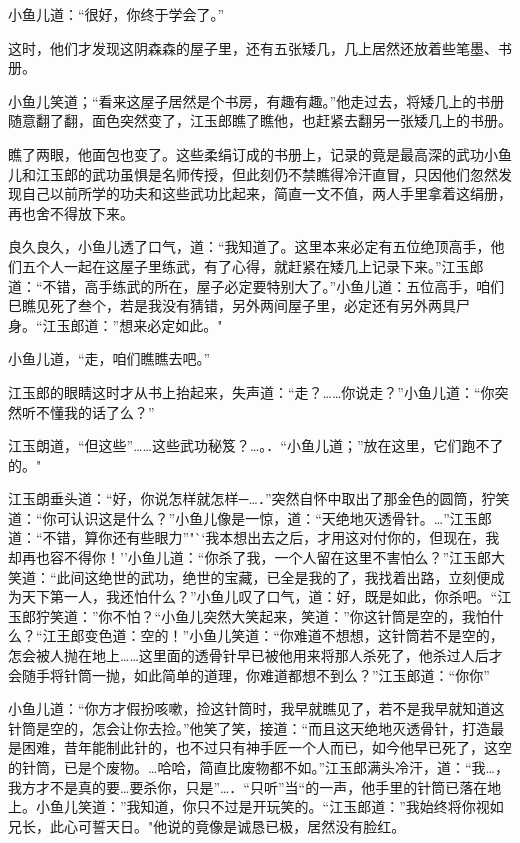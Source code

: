 \documentclass[12pt,oneside]{book}
\begin{document}
小鱼儿道：``很好，你终于学会了。''

这时，他们才发现这阴森森的屋子里，还有五张矮几，几上居然还放着些笔墨、书册。

小鱼儿笑道；``看来这屋子居然是个书房，有趣有趣。''他走过去，将矮几上的书册随意翻了翻，面色突然变了，江玉郎瞧了瞧他，也赶紧去翻另一张矮几上的书册。

瞧了两眼，他面包也变了。这些柔绢订成的书册上，记录的竟是最高深的武功小鱼儿和江玉郎的武功虽惧是名师传授，但此刻仍不禁瞧得冷汗直冒，只因他们忽然发现自己以前所学的功夫和这些武功比起来，简直一文不值，两人手里拿着这绢册，再也舍不得放下来。

良久良久，小鱼儿透了口气，道：``我知道了。这里本来必定有五位绝顶高手，他们五个人一起在这屋子里练武，有了心得，就赶紧在矮几上记录下来。''江玉郎道：``不错，高手练武的所在，屋子必定要特别大了。''小鱼儿道：五位高手，咱们巳瞧见死了叁个，若是我没有猜错，另外两间屋子里，必定还有另外两具尸身。``江玉郎道：''想来必定如此。"

小鱼儿道，``走，咱们瞧瞧去吧。''

江玉郎的眼睛这时才从书上抬起来，失声道：``走？\ldots\ldots 你说走？''小鱼儿道：``你突然听不懂我的话了么？''

江玉朗道，``但这些''\ldots\ldots 这些武功秘笈？\ldots。．``小鱼儿道；''放在这里，它们跑不了的。"

江玉朗垂头道：``好，你说怎样就怎样─\ldots．''突然自怀中取出了那金色的圆筒，狞笑道：``你可认识这是什么？''小鱼儿像是一惊，道：``天绝地灭透骨针。\ldots{}''江玉郎道：``不错，算你还有些眼力''"``我本想出去之后，才用这对付你的，但现在，我却再也容不得你！''小鱼儿道：``你杀了我，一个人留在这里不害怕么？''江玉郎大笑道：``此间这绝世的武功，绝世的宝藏，已全是我的了，我找着出路，立刻便成为天下第一人，我还怕什么？''小鱼儿叹了口气，道：好，既是如此，你杀吧。``江玉郎狞笑道：''你不怕？``小鱼儿突然大笑起来，笑道：''你这针筒是空的，我怕什么？``江王郎变色道：空的！''小鱼儿笑道：``你难道不想想，这针筒若不是空的，怎会被人抛在地上\ldots\ldots 这里面的透骨针早已被他用来将那人杀死了，他杀过人后才会随手将针筒一抛，如此简单的道理，你难道都想不到么？''江玉郎道：``你你''

小鱼儿道：``你方才假扮咳嗽，捡这针筒时，我早就瞧见了，若不是我早就知道这针筒是空的，怎会让你去捡。''他笑了笑，接道：``而且这天绝地灭透骨针，打造最是困难，昔年能制此针的，也不过只有神手匠一个人而已，如今他早已死了，这空的针筒，已是个废物。\ldots 哈哈，简直比废物都不如。''江玉郎满头冷汗，道：``我\ldots，我方才不是真的要\ldots 要杀你，只是''\ldots．``只听''当``的一声，他手里的针筒已落在地上。小鱼儿笑道：''我知道，你只不过是开玩笑的。``江玉郎道：''我始终将你视如兄长，此心可誓天日。"他说的竟像是诚恳已极，居然没有脸红。
\end{document}
